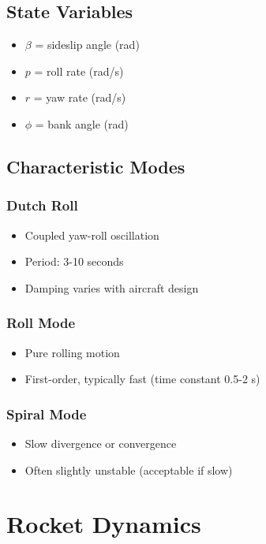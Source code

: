\subsection{State Variables}

\begin{itemize}
    \item $\beta$ = sideslip angle (rad)
    \item $p$ = roll rate (rad/s)
    \item $r$ = yaw rate (rad/s)
    \item $\phi$ = bank angle (rad)
\end{itemize}

\subsection{Characteristic Modes}

\subsubsection{Dutch Roll}
\begin{itemize}
    \item Coupled yaw-roll oscillation
    \item Period: 3-10 seconds
    \item Damping varies with aircraft design
\end{itemize}

\subsubsection{Roll Mode}
\begin{itemize}
    \item Pure rolling motion
    \item First-order, typically fast (time constant 0.5-2 s)
\end{itemize}

\subsubsection{Spiral Mode}
\begin{itemize}
    \item Slow divergence or convergence
    \item Often slightly unstable (acceptable if slow)
\end{itemize}

\section{Rocket Dynamics}
\label{sec:rocket}


